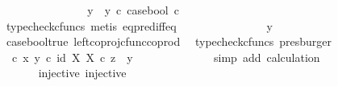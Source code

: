 \begin{isabellebody}
\ \ \ \ \ \ \ \ \ \ \isamarkupfalse%
\ \isamarkupfalse%
\ {\isachardoublequoteopen}{\isachardot}{\kern0pt}{\isachardot}{\kern0pt}{\isachardot}{\kern0pt}\ {\isacharequal}{\kern0pt}\ {\isacharparenleft}{\kern0pt}y{}\ {\isasymamalg}\ y{}{\isacharparenright}{\kern0pt}\ {\isasymcirc}\isactrlsub c\ case{\isacharunderscore}{\kern0pt}bool\ {\isasymcirc}\isactrlsub c\ {\isasymt}{\isachardoublequoteclose}\isanewline
\ \ \ \ \ \ \ \ \ \ \ \ \isamarkupfalse%
\ {\isacharparenleft}{\kern0pt}typecheck{\isacharunderscore}{\kern0pt}cfuncs{\isacharcomma}{\kern0pt}\ metis\ eq{\isacharunderscore}{\kern0pt}pred{\isacharunderscore}{\kern0pt}iff{\isacharunderscore}{\kern0pt}eq{\isacharparenright}{\kern0pt}\isanewline
\ \ \ \ \ \ \ \ \ \ \isamarkupfalse%
\ \isamarkupfalse%
\ {\isachardoublequoteopen}{\isachardot}{\kern0pt}{\isachardot}{\kern0pt}{\isachardot}{\kern0pt}\ {\isacharequal}{\kern0pt}\ y{}{\isachardoublequoteclose}\isanewline
\ \ \ \ \ \ \ \ \ \ \ \ \isamarkupfalse%
\ case{\isacharunderscore}{\kern0pt}bool{\isacharunderscore}{\kern0pt}true\ left{\isacharunderscore}{\kern0pt}coproj{\isacharunderscore}{\kern0pt}cfunc{\isacharunderscore}{\kern0pt}coprod\ \isamarkupfalse%
\ {\isacharparenleft}{\kern0pt}typecheck{\isacharunderscore}{\kern0pt}cfuncs{\isacharcomma}{\kern0pt}\ presburger{\isacharparenright}{\kern0pt}\isanewline
\ \ \ \ \ \ \ \ \ \ \isamarkupfalse%
\ \isamarkupfalse%
\ {\isachardoublequoteopen}{\isacharparenleft}{\kern0pt}{\isasymTheta}\ {\isasymcirc}\isactrlsub c\ {\isasymlangle}x{\isacharcomma}{\kern0pt}\ y{}{\isasymrangle}{\isacharparenright}{\kern0pt}\isactrlsup {\isasymflat}\ {\isasymcirc}\isactrlsub c\ {\isasymlangle}id\ X{\isacharcomma}{\kern0pt}\ {\isasymbeta}\isactrlbsub X\isactrlesub {\isasymrangle}\ {\isasymcirc}\isactrlsub c\ z\ {\isacharequal}{\kern0pt}\ y{}{\isachardoublequoteclose}\isanewline
\ \ \ \ \ \ \ \ \ \ \ \ \isamarkupfalse%
\ {\isacharparenleft}{\kern0pt}simp\ add{\isacharcolon}{\kern0pt}\ calculation{\isacharparenright}{\kern0pt}\isanewline
\ \ \ \ \ \ \ \ \isamarkupfalse%
\isanewline
\ \ \isanewline
\ \ \ \ \ \isamarkupfalse%
\ {\isasymTheta}{\isacharunderscore}{\kern0pt}injective{\isacharcolon}{\kern0pt}\ {\isachardoublequoteopen}injective{\isacharparenleft}{\kern0pt}{\isasymTheta}{\isacharparenright}{\kern0pt}{\isachardoublequoteclose}\isanewline
\ \ \ \ \ \ \ \isamarkupfalse%

\end{isabellebody}
